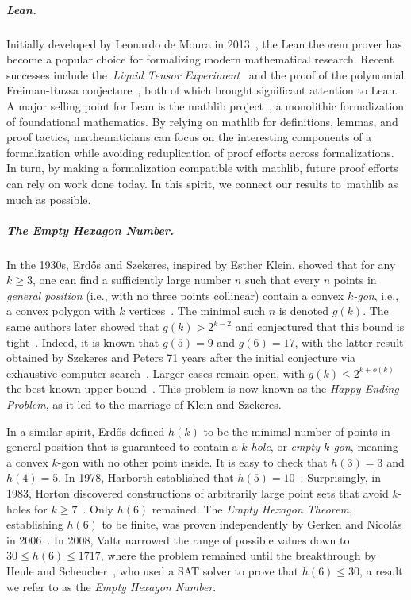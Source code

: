 \subparagraph*{Lean.}
Initially developed by Leonardo de Moura in 2013~\cite{demouraLeanTheoremProver2015},
the Lean theorem prover has become a popular choice for formalizing modern mathematical research.
Recent successes include the~\emph{Liquid Tensor Experiment}~\cite{Castelvecchi2021}
and the proof of the polynomial Freiman-Ruzsa conjecture~\cite{gowers2023conjecture, slomanATeamMathProves2023},
both of which brought significant attention to Lean.
A major selling point for Lean is the \textsf{mathlib} project~\cite{The_mathlib_Community_2020},
a monolithic formalization of foundational mathematics.
By relying on \textsf{mathlib} for definitions, lemmas, and proof tactics,
mathematicians can focus on the interesting components of a formalization
while avoiding reduplication of proof efforts across formalizations.
In turn, by making a formalization compatible with \textsf{mathlib},
future proof efforts can rely on work done today.
In this spirit, we connect our results to~\textsf{mathlib} as much as possible.

\subparagraph*{The Empty Hexagon Number.}
In the 1930s,
Erd\H{o}s and Szekeres, inspired by Esther Klein, showed that for any $k \geq 3$,
one can find a sufficiently large number $n$
such that every $n$ points in \emph{general position}
(i.e., with no three points collinear)
contain a convex \emph{$k$-gon}, i.e., a convex polygon with $k$ vertices~\cite{35erdos_combinatorial_problem_geometry}.
The minimal such $n$ is denoted $g(k)$.
The same authors later showed that $g(k) > 2^{k-2}$
and conjectured that this bound is tight~\cite{60erdos_some_extremum_problems_elementary_geometry}.
Indeed, it is known that $g(5) = 9$ and $g(6) = 17$,
with the latter result obtained by Szekeres and Peters 71 years after the initial conjecture
via exhaustive computer search~\cite{06szekeres_computer_solution_17_point_erdos_szekeres_problem}.
Larger cases remain open,
with $g(k) \leq 2^{k+o(k)}$ the best known upper bound~\cite{suk2017erdos,holmsen2017two}.
This problem is now known as the \emph{Happy Ending Problem},
as it led to the marriage of Klein and Szekeres.

In a similar spirit,
Erd\H{o}s defined $h(k)$
to be the minimal number of points in general position
that is guaranteed to contain a \emph{$k$-hole},
or \emph{empty $k$-gon},
meaning a convex $k$-gon with no other point inside.
It is easy to check that $h(3) = 3$ and $h(4) = 5$.
In 1978, Harborth established that $h(5) = 10$~\cite{Harborth1978}.
Surprisingly, in 1983, Horton discovered constructions of arbitrarily large point sets that 
avoid $k$-holes for $k \geq 7$~\cite{hortonSetsNoEmpty1983}.
Only $h (6)$ remained.
The \emph{Empty Hexagon Theorem},
establishing $h(6)$ to be finite,
was proven independently by Gerken and Nicolás in 2006~\cite{gerkenEmptyConvexHexagons2008,nicolasEmptyHexagonTheorem2007}.
In 2008, Valtr narrowed the range of possible values down to $30 \leq h(6) \leq 1717$,
where the problem remained until the breakthrough by Heule and Scheucher~\cite{emptyHexagonNumber},
who used a SAT solver to prove that $h(6) \leq 30$,
a result we refer to as the \emph{Empty Hexagon Number}.
